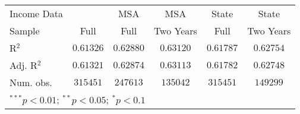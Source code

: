 \begin{tabular}{l c c c c c}
Income Data           &                  & MSA              & MSA              & State            & State            \\
Sample                & Full             & Full             & Two Years        & Full             & Two Years        \\
R$^2$                 & $0.61326$        & $0.62880$        & $0.63120$        & $0.61787$        & $0.62754$        \\
Adj. R$^2$            & $0.61321$        & $0.62874$        & $0.63113$        & $0.61782$        & $0.62748$        \\
Num. obs.             & $315451$         & $247613$         & $135042$         & $315451$         & $149299$         \\
\hline
\multicolumn{6}{l}{\scriptsize{$^{***}p<0.01$; $^{**}p<0.05$; $^{*}p<0.1$}}
\end{tabular}
